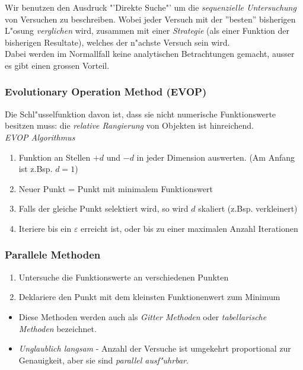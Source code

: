 \documentclass[german, 10pt, a4paper, twocolumn]{scrartcl}
\begin{document}
Wir benutzen den Ausdruck "'Direkte Suche"' um die \textit{sequenzielle Untersuchung} von Versuchen zu beschreiben. Wobei jeder Versuch mit der ''besten'' bisherigen L"osung \textit{verglichen} wird, zusammen mit einer \textit{Strategie} (als einer Funktion der bisherigen Resultate), welches der n"achste Versuch sein wird.\\
Dabei werden im Normallfall keine analytischen Betrachtungen gemacht, ausser es gibt einen grossen Vorteil.

\subsubsection{Evolutionary Operation Method (EVOP)}

Die Schl"usselfunktion davon ist, dass sie nicht numerische Funktionswerte besitzen muss: die \textit{relative Rangierung} von Objekten ist hinreichend.\\

\textit{EVOP Algorithmus}
	\begin{enumerate}
		\item Funktion an Stellen $+d$ und $-d$ in jeder Dimension auswerten. (Am Anfang ist z.Bsp. $d = 1$)
		\item Neuer Punkt = Punkt mit minimalem Funktionswert
		\item Falls der gleiche Punkt selektiert wird, so wird $d$ skaliert (z.Bsp. verkleinert) 
		\item Iteriere bis ein $\varepsilon$ erreicht ist, oder bis zu einer maximalen Anzahl Iterationen
	\end{enumerate}

\subsubsection{Parallele Methoden}

\begin{enumerate}
	\item Untersuche die Funktionswerte an verschiedenen Punkten
	\item Deklariere den Punkt mit dem kleinsten Funktionenwert zum Minimum
\end{enumerate}

\begin{itemize}
	\item Diese Methoden werden auch als \textit{Gitter Methoden} oder \textit{tabellarische Methoden} bezeichnet.
	\item \textit{Unglaublich langsam} - Anzahl der Versuche ist umgekehrt proportional zur Genauigkeit, aber sie sind \textit{parallel ausf"uhrbar}.
\end{itemize}
\end{document}
